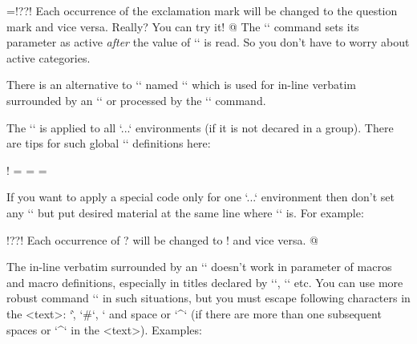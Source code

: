 \begtt   \adef@{\string\endtt}
\everytt={\adef!{?}\adef?{!}}
\begtt
Each occurrence of the exclamation mark will be changed to 
the question mark and vice versa. Really? You can try it! 
@
\endtt
%
The `\adef` command sets its parameter as active {\it after\/}
the value of `\everytt` is read. So you don't have to worry about active
categories. 

There is an alternative to `\everytt` named `\everyintt` which is used for
in-line verbatim surrounded by an `\activettchar` or processed by the `\code`
command.

The `\everytt` is applied to all `\begtt...\endtt` environments (if it is not
decared in a group). There are tips for such global `\everytt` definitions here:

\begtt \adef!{ }
\everytt={\typosize[9/11]}  %
\everytt={}        %
\everytt={\visiblesp}       %
\endtt

\new
If you want to apply a special code only for one `\begtt...\endtt`
environment then don't set any `\everytt` but put desired material at the 
same line where `\begtt` is. For example:

\begtt   \adef@{\string\endtt}
\begtt   \adef!{?}\adef?{!}
Each occurrence of ? will be changed to ! and vice versa. 
@
\endtt

The in-line verbatim surrounded by an `\activettchar` doesn't work in
parameter of macros and macro definitions, especially in titles declared by
`\chap`, `\sec` etc. 
\new
You can use more robust command `` in such
situations, but you must escape following characters in the <text>:
`\`, `#`, `%
and space or `^` (if there are more than one subsequent spaces or `^` in 
the <text>). Examples:

